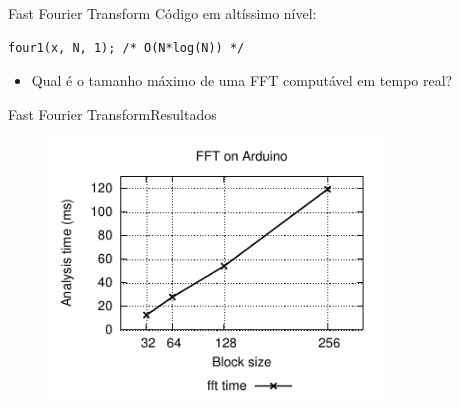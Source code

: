 
\begin{frame}[fragile]{Fast Fourier Transform}
Código em altíssimo nível:
\begin{lstlisting}
four1(x, N, 1); /* O(N*log(N)) */
\end{lstlisting}
\begin{itemize}
  \item Qual é o tamanho máximo de uma FFT computável em tempo real?
\end{itemize}
\end{frame}


\begin{frame}{Fast Fourier Transform}{Resultados}
\begin{figure}
\includegraphics[width=0.8\textwidth]{./img/fft.pdf}
\end{figure}
\end{frame}

